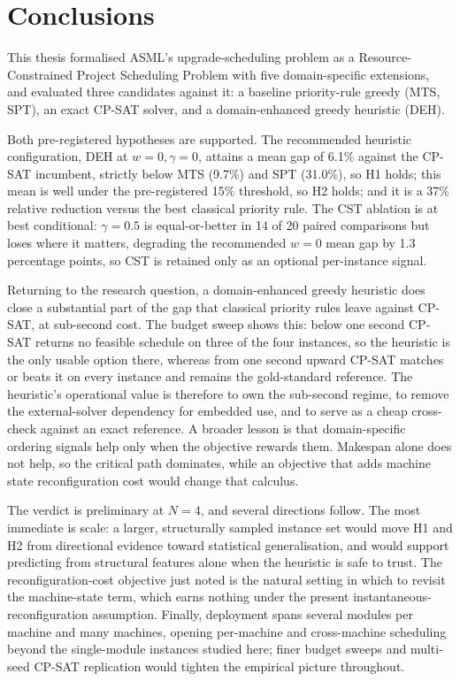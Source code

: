 \documentclass[conference]{IEEEtran}
\begin{document}
\section{Conclusions}
\label{sec:conclusions}

This thesis formalised ASML's upgrade-scheduling problem as a
Resource-Constrained Project Scheduling Problem with five
domain-specific extensions, and evaluated three candidates against
it: a baseline priority-rule greedy (MTS, SPT), an exact CP-SAT
solver, and a domain-enhanced greedy heuristic (DEH).

Both pre-registered hypotheses are supported. The recommended
heuristic configuration, DEH at $w = 0, \gamma = 0$, attains a mean
gap of 6.1\% against the CP-SAT incumbent, strictly below MTS (9.7\%)
and SPT (31.0\%), so H1 holds; this mean is well under the
pre-registered 15\% threshold, so H2 holds; and it is a 37\% relative
reduction versus the best classical priority rule. The CST ablation
is at best conditional: $\gamma = 0.5$ is equal-or-better in 14 of 20
paired comparisons but loses where it matters, degrading the
recommended $w = 0$ mean gap by 1.3 percentage points, so CST is
retained only as an optional per-instance signal.

Returning to the research question, a domain-enhanced greedy
heuristic does close a substantial part of the gap that classical
priority rules leave against CP-SAT, at sub-second cost. The budget
sweep shows this: below one second CP-SAT returns no
feasible schedule on three of the four instances, so the heuristic is
the only usable option there, whereas from one second upward CP-SAT
matches or beats it on every instance and remains the gold-standard
reference. The heuristic's operational value is therefore to own the
sub-second regime, to remove the external-solver dependency for
embedded use, and to serve as a cheap cross-check against an exact
reference. A broader lesson is that domain-specific ordering signals help only
when the objective rewards them. Makespan alone does not help, so the
critical path dominates, while an objective that adds machine state
reconfiguration cost would change that calculus.

The verdict is preliminary at $N = 4$, and several directions follow.
The most immediate is scale: a larger, structurally sampled instance
set would move H1 and H2 from directional evidence toward statistical
generalisation, and would support predicting from structural features
alone when the heuristic is safe to trust. The reconfiguration-cost
objective just noted is the natural setting in which to revisit the
machine-state term, which earns nothing under the present
instantaneous-reconfiguration assumption. Finally, deployment spans
several modules per machine and many machines, opening per-machine and
cross-machine scheduling beyond the single-module instances studied
here; finer budget sweeps and multi-seed CP-SAT replication would
tighten the empirical picture throughout.
\end{document}
